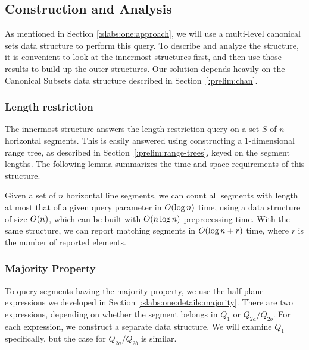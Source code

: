 \subsection{Construction and Analysis}
\label{:slabs:one:analysis}

As mentioned in Section \ref{:slabs:one:approach}, we will use a multi-level canonical sets data structure to perform this query.  To describe and analyze the structure, it is convenient to look at the innermost structures first, and then use those results to build up the outer structures.  Our solution depends heavily on the Canonical Subsets data structure described in Section~\ref{:prelim:chan}.


\subsubsection{Length restriction}

The innermost structure answers the length restriction query on a set $S$ of $n$ horizontal segments. This is easily answered using constructing a 1-dimensional range tree, as described in Section~\ref{:prelim:range-trees}, keyed on the segment lengths. The following lemma summarizes the time and space requirements of this structure.

\begin{lemma}
\label{lem:slabs:one:step1}
Given a set of $n$ horizontal line segments, we can count all segments with length at most that of a given query parameter in $O\!\left(\log{n}\right)$ time, using a data structure of size $O\!\left(n\right)$, which can be built with $O\!\left(n \log{n}\right)$ preprocessing time. With the same structure, we can report matching segments in $O\!\left(\log{n} + r\right)$ time, where $r$ is the number of reported elements.
\end{lemma}


\subsubsection{Majority Property}

To query segments having the majority property, we use the half-plane expressions we developed in Section \ref{:slabs:one:details:majority}.  There are two expressions, depending on whether the segment belongs in $Q_1$ or $Q_{2a}/Q_{2b}$. For each expression, we construct a separate data structure. We will examine $Q_1$ specifically, but the case for $Q_{2a}/Q_{2b}$ is similar.

